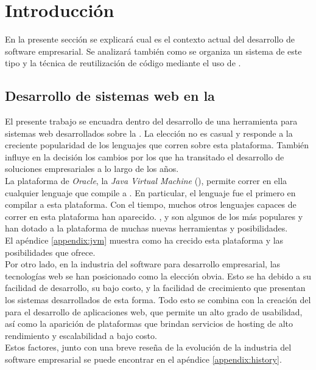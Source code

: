 \section{Introducción}
\label{sec:intro}

En la presente sección se explicará cual es el contexto actual del desarrollo 
de software empresarial. Se analizará también como se organiza un sistema de 
este tipo y la técnica de reutilización de código mediante el uso de 
\dependencies.\\


\subsection{Desarrollo de sistemas web en la \jvm}
\label{subsec:intro:jvm_dev}

El presente trabajo se encuadra dentro del desarrollo de una herramienta para 
sistemas web desarrollados sobre la \jvm. La elección no es casual y responde 
a la creciente popularidad de los lenguajes que corren sobre esta plataforma. 
También influye en la decisión los cambios por los que ha transitado el
desarrollo de soluciones empresariales a lo largo de los años.\\
La plataforma de \emph{Oracle}, la \emph{Java Virtual Machine} (\jvm), permite 
correr  en ella cualquier lenguaje que compile a \bytecode \java. En 
particular, el lenguaje \java fue el primero en compilar a esta plataforma. Con 
el tiempo, muchos otros lenguajes capaces de correr en esta plataforma han 
aparecido. \scala, \clojure y \groovy  son algunos de los más populares y han 
dotado a la  plataforma de muchas nuevas herramientas y posibilidades.\\
El apéndice \ref{appendix:jvm} muestra como ha crecido esta plataforma y las 
posibilidades que ofrece.\\
Por otro lado, en la industria del software para desarrollo empresarial, las 
tecnologías web se han posicionado como la elección obvia. Esto se ha debido a 
su facilidad de desarrollo, su bajo costo, y la facilidad de crecimiento que 
presentan los sistemas desarrollados de esta forma. Todo esto se combina con 
la creación del  para el desarrollo de aplicaciones web, que permite un 
alto grado de usabilidad, así como la aparición de plataformas que brindan 
servicios de hosting de alto rendimiento y escalabilidad a bajo costo.\\
Estos factores, junto con una breve reseña de la evolución de la industria del 
software empresarial se puede encontrar en el apéndice \ref{appendix:history}.

